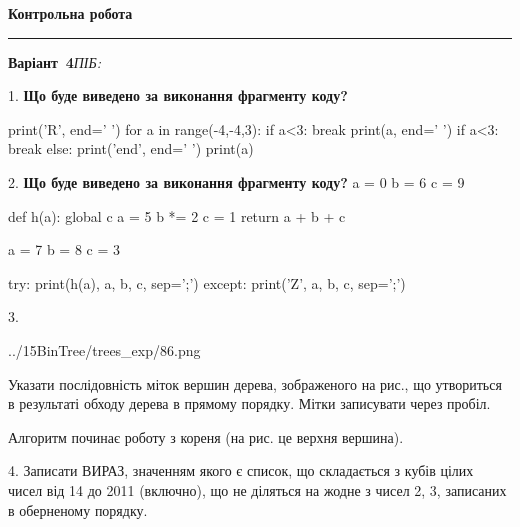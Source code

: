 \documentclass[11pt]{article}
\begin{document}
{\centering\Large\bfseries Контрольна робота\par}
\medskip
\noindent\rule{\linewidth}{0.5pt}
\smallskip
\noindent\textbf{Варіант \No\,4}\hfill \textit{ПІБ:}\,\underline{\hspace{60mm}}
\vspace{4mm}

1. \textbf{Що буде виведено за виконання фрагменту коду?}

print('R', end=' ')
for a in range(-4,-4,3):
    if a<3:
        break
        print(a, end=' ')
    if a<3:
        break
    else:
        print('end', end=' ')
    print(a)
\vspace{5mm}

2. \textbf{Що буде виведено за виконання фрагменту коду?}
a = 0
b = 6
c = 9

def h(a):
global c    a = 5
    b *= 2
    c = 1
    return a + b + c

a = 7
b = 8
c = 3

try:
    print(h(a), a, b, c, sep=';')
except:
    print('Z', a, b, c, sep=';')
\vspace{5mm}

3. 

\begin{center}
	{../15BinTree/trees_exp/86.png}
\end{center}
Указати послідовність міток вершин дерева, зображеного на рис., що утвориться в результаті обходу дерева в прямому порядку. Мітки записувати через пробіл.\par Алгоритм починає роботу з кореня (на рис. це верхня вершина).
\vspace{5mm}

4. 
Записати ВИРАЗ, значенням якого є список, що складається з кубів цілих чисел від 14 до 2011 (включно), що не діляться на жодне з чисел 2, 3, записаних в оберненому порядку.\vspace{5mm}
\end{document}
